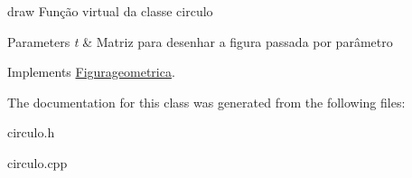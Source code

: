 draw Função virtual da classe circulo 


\begin{DoxyParams}{Parameters}
{\em t} & Matriz para desenhar a figura passada por parâmetro \\
\hline
\end{DoxyParams}


Implements \mbox{\hyperlink{class_figurageometrica_a68d9aba508879bb7a9ea1fe9d1d4f5f4}{Figurageometrica}}.



The documentation for this class was generated from the following files\+:\begin{DoxyCompactItemize}
\item 
circulo.\+h\item 
circulo.\+cpp\end{DoxyCompactItemize}
